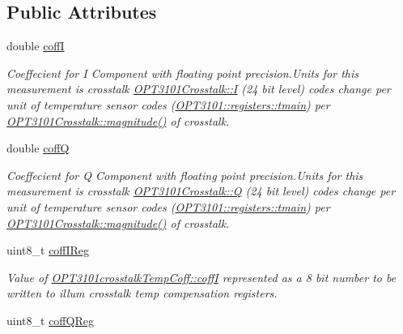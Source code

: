 \subsection*{Public Attributes}
\begin{DoxyCompactItemize}
\item 
double \mbox{\hyperlink{class_o_p_t3101crosstalk_temp_coff_ac111d5555887277804f4b0ee8f555349}{coffI}}
\begin{DoxyCompactList}\small\item\em Coeffecient for I Component with floating point precision.\+Units for this measurement is crosstalk \mbox{\hyperlink{class_o_p_t3101_crosstalk_a382c8271e35b33821b22d612466c96c7}{O\+P\+T3101\+Crosstalk\+::I}} (24 bit level) codes change per unit of temperature sensor codes (\mbox{\hyperlink{class_o_p_t3101_1_1registers_a3dfd8d81d4cb04d274007deb7c6122fc}{O\+P\+T3101\+::registers\+::tmain}}) per \mbox{\hyperlink{class_o_p_t3101_crosstalk_acb6217116c652bc7c0c84e7b86504f18}{O\+P\+T3101\+Crosstalk\+::magnitude()}} of crosstalk. \end{DoxyCompactList}\item 
double \mbox{\hyperlink{class_o_p_t3101crosstalk_temp_coff_a6d2ce80b4e1936571777185f302305b5}{coffQ}}
\begin{DoxyCompactList}\small\item\em Coeffecient for Q Component with floating point precision.\+Units for this measurement is crosstalk \mbox{\hyperlink{class_o_p_t3101_crosstalk_a0454e10774015dd2e941f9284ea516da}{O\+P\+T3101\+Crosstalk\+::Q}} (24 bit level) codes change per unit of temperature sensor codes (\mbox{\hyperlink{class_o_p_t3101_1_1registers_a3dfd8d81d4cb04d274007deb7c6122fc}{O\+P\+T3101\+::registers\+::tmain}}) per \mbox{\hyperlink{class_o_p_t3101_crosstalk_acb6217116c652bc7c0c84e7b86504f18}{O\+P\+T3101\+Crosstalk\+::magnitude()}} of crosstalk. \end{DoxyCompactList}\item 
uint8\+\_\+t \mbox{\hyperlink{class_o_p_t3101crosstalk_temp_coff_a5dd870ca86bfb7314dfaa636654d797e}{coff\+I\+Reg}}
\begin{DoxyCompactList}\small\item\em Value of \mbox{\hyperlink{class_o_p_t3101crosstalk_temp_coff_ac111d5555887277804f4b0ee8f555349}{O\+P\+T3101crosstalk\+Temp\+Coff\+::coffI}} represented as a 8 bit number to be written to illum crosstalk temp compensation registers. \end{DoxyCompactList}\item 
uint8\+\_\+t \mbox{\hyperlink{class_o_p_t3101crosstalk_temp_coff_abe7525dd02d13dbbb4ea329b5dfa9250}{coff\+Q\+Reg}}

\end{DoxyCompactItemize}
